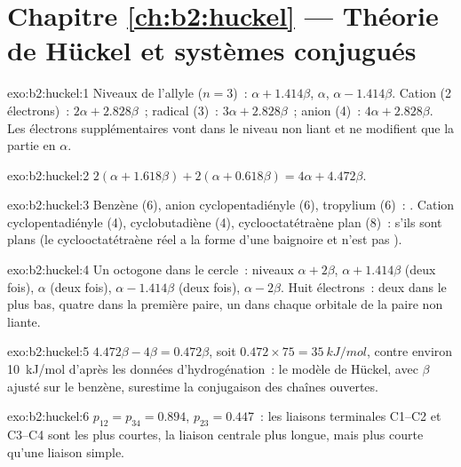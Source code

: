 \section*{Chapitre \ref{ch:b2:huckel} --- Théorie de Hückel et systèmes conjugués}

\begin{solution}{exo:b2:huckel:1}
Niveaux de l'allyle ($n = 3$)~: $\alpha + 1.414\beta$, $\alpha$, $\alpha - 1.414\beta$. Cation (2 électrons)~:
$2\alpha + 2.828\beta$~; radical (3)~: $3\alpha + 2.828\beta$~; anion (4)~: $4\alpha + 2.828\beta$. Les électrons
supplémentaires vont dans le niveau non liant et ne modifient que la partie en $\alpha$.
\end{solution}

\begin{solution}{exo:b2:huckel:2}
$2(\alpha + 1.618\beta) + 2(\alpha + 0.618\beta) = 4\alpha + 4.472\beta$.
\end{solution}

\begin{solution}{exo:b2:huckel:3}
Benzène (6), anion cyclopentadiényle (6), tropylium (6)~: . Cation
cyclopentadiényle (4), cyclobutadiène (4), cyclooctatétraène plan (8)~:  s'ils sont plans
(le cyclooctatétraène réel a la forme d'une baignoire et n'est pas ).
\end{solution}

\begin{solution}{exo:b2:huckel:4}
Un octogone dans le cercle~: niveaux $\alpha + 2\beta$, $\alpha + 1.414\beta$ (deux fois), $\alpha$ (deux fois),
$\alpha - 1.414\beta$ (deux fois), $\alpha - 2\beta$. Huit électrons~: deux dans le plus bas, quatre dans la
première paire, un dans chaque orbitale de la paire non liante.
\end{solution}

\begin{solution}{exo:b2:huckel:5}
$4.472\beta - 4\beta = 0.472\beta$, soit $0.472 \times 75 = \qty{35}{kJ/mol}$, contre environ
\qty{10}{kJ/mol} d'après les données d'hydrogénation~: le modèle de Hückel, avec $\beta$ ajusté sur le benzène,
surestime la conjugaison des chaînes ouvertes.
\end{solution}

\begin{solution}{exo:b2:huckel:6}
$p_{12} = p_{34} = 0.894$, $p_{23} = 0.447$~: les liaisons terminales C1--C2 et C3--C4 sont les
plus courtes, la liaison centrale plus longue, mais plus courte qu'une liaison simple.
\end{solution}

